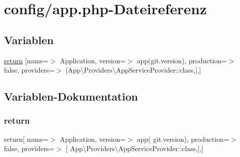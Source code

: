\hypertarget{config_2app_8php}{}\section{config/app.php-\/\+Dateireferenz}
\label{config_2app_8php}
\subsection*{Variablen}
\begin{DoxyCompactItemize}
\item 
\hyperlink{config_2app_8php_acb3db523be8b6317fe3e73b4ca6a9bcf}{return} \mbox{[}\textquotesingle{}name\textquotesingle{}=$>$ \textquotesingle{}Application\textquotesingle{}, \textquotesingle{}version\textquotesingle{}=$>$ app(\textquotesingle{}git.\+version\textquotesingle{}), \textquotesingle{}production\textquotesingle{}=$>$ false, \textquotesingle{}providers\textquotesingle{}=$>$ \mbox{[}App\textbackslash{}\+Providers\textbackslash{}\+App\+Service\+Provider\+::class,\mbox{]},\mbox{]}
\end{DoxyCompactItemize}


\subsection{Variablen-\/\+Dokumentation}
\mbox{\label{config_2app_8php_acb3db523be8b6317fe3e73b4ca6a9bcf}} 
\subsubsection{\texorpdfstring{return}{return}}
{\footnotesize\ttfamily return\mbox{[} \textquotesingle{}name\textquotesingle{}=$>$ \textquotesingle{}Application\textquotesingle{}, \textquotesingle{}version\textquotesingle{}=$>$ app( \textquotesingle{}git.\+version\textquotesingle{}), \textquotesingle{}production\textquotesingle{}=$>$ false, \textquotesingle{}providers\textquotesingle{}=$>$ \mbox{[} App\textbackslash{}\+Providers\textbackslash{}\+App\+Service\+Provider\+::class,\mbox{]},\mbox{]}}

